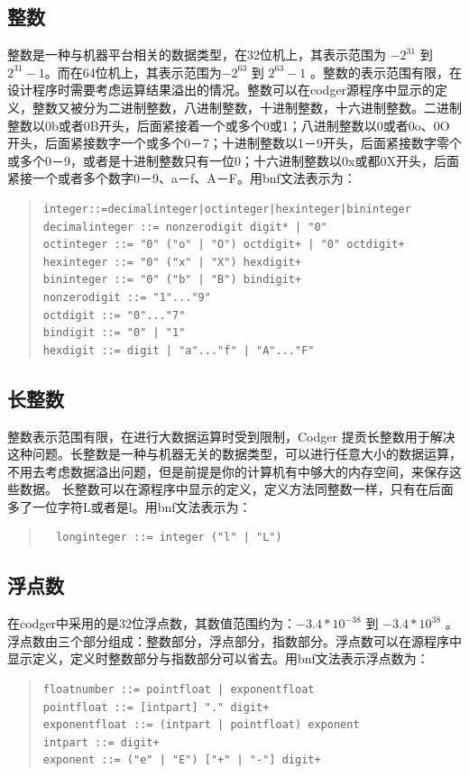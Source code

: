 \subsection{整数}
整数是一种与机器平台相关的数据类型，在32位机上，其表示范围为 $-2^{31}$ 到 $2^{31}-1$。而在64位机上，其表示范围为$-2^{63}$ 到 $2^{63}-1$ 。整数的表示范围有限，在设计程序时需要考虑运算结果溢出的情况。整数可以在codger源程序中显示的定义，整数又被分为二进制整数，八进制整数，十进制整数，十六进制整数。二进制整数以0b或者0B开头，后面紧接着一个或多个0或1；八进制整数以0或者0o、0O开头，后面紧接数字一个或多个0－7；十进制整数以1－9开头，后面紧接数字零个或多个0－9，或者是十进制整数只有一位0；十六进制整数以0x或都0X开头，后面紧接一个或者多个数字0－9、a－f、A－F。用bnf文法表示为：
\begin{quote}
\begin{verbatim}
integer::=decimalinteger|octinteger|hexinteger|bininteger
decimalinteger ::= nonzerodigit digit* | "0"
octinteger ::= "0" ("o" | "O") octdigit+ | "0" octdigit+
hexinteger ::= "0" ("x" | "X") hexdigit+
bininteger ::= "0" ("b" | "B") bindigit+
nonzerodigit ::= "1"..."9"
octdigit ::= "0"..."7"
bindigit ::= "0" | "1"
hexdigit ::= digit | "a"..."f" | "A"..."F"
\end{verbatim}
\end{quote}

\subsection{长整数}
整数表示范围有限，在进行大数据运算时受到限制，Codger 提贡长整数用于解决这种问题。长整数是一种与机器无关的数据类型，可以进行任意大小的数据运算，不用去考虑数据溢出问题，但是前提是你的计算机有中够大的内存空间，来保存这些数据。 长整数可以在源程序中显示的定义，定义方法同整数一样，只有在后面多了一位字符L或者是l。用bnf文法表示为：
\begin{quote}
 \begin{verbatim}
  longinteger ::= integer ("l" | "L")
 \end{verbatim}
\end{quote}

\subsection{浮点数}
在codger中采用的是32位浮点数，其数值范围约为：$-3.4*10^{-38}$ 到 $-3.4*10^{38}$ 。浮点数由三个部分组成：整数部分，浮点部分，指数部分。浮点数可以在源程序中显示定义，定义时整数部分与指数部分可以省去。用bnf文法表示浮点数为：
\begin{quote}
 \begin{verbatim}
floatnumber ::= pointfloat | exponentfloat
pointfloat ::= [intpart] "." digit+
exponentfloat ::= (intpart | pointfloat) exponent
intpart ::= digit+
exponent ::= ("e" | "E") ["+" | "-"] digit+
 \end{verbatim}
\end{quote}
